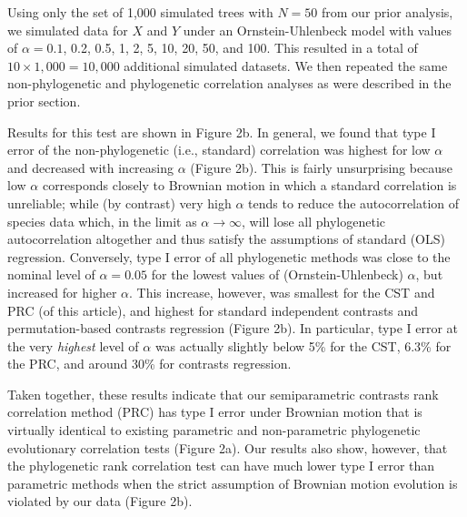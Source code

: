 \documentclass[fleqn,10pt,lineno]{wlpeerj} %
\begin{document}
Using only the set of 1,000 simulated trees with \(N=50\) from our prior analysis, we simulated data for \(X\) and \(Y\) under an Ornstein-Uhlenbeck model with values of \(\alpha = 0.1\), 0.2, 0.5, 1, 2, 5, 10, 20, 50, and 100. This resulted in a total of \(10 \times 1,000 = 10,000\) additional simulated datasets. We then repeated the same non-phylogenetic and phylogenetic correlation analyses as were described in the prior section.

Results for this test are shown in Figure 2b. In general, we found that type I error of the non-phylogenetic (i.e., standard) correlation was highest for low \(\alpha\) and decreased with increasing \(\alpha\) (Figure 2b). This is fairly unsurprising because low \(\alpha\) corresponds closely to Brownian motion in which a standard correlation is unreliable; while (by contrast) very high \(\alpha\) tends to reduce the autocorrelation of species data which, in the limit as \(\alpha \rightarrow \infty\), will lose all phylogenetic autocorrelation altogether and thus satisfy the assumptions of standard (OLS) regression. Conversely, type I error of all phylogenetic methods was close to the nominal level of \(\alpha = 0.05\) for the lowest values of (Ornstein-Uhlenbeck) \(\alpha\), but increased for higher \(\alpha\). This increase, however, was smallest for the CST and PRC (of this article), and highest for standard independent contrasts and permutation-based contrasts regression (Figure 2b). In particular, type I error at the very \emph{highest} level of \(\alpha\) was actually slightly below 5\% for the CST, 6.3\% for the PRC, and around 30\% for contrasts regression.

Taken together, these results indicate that our semiparametric contrasts rank correlation method (PRC) has type I error under Brownian motion that is virtually identical to existing parametric and non-parametric phylogenetic evolutionary correlation tests (Figure 2a). Our results also show, however, that the phylogenetic rank correlation test can have much lower type I error than parametric methods when the strict assumption of Brownian motion evolution is violated by our data (Figure 2b).
\end{document}
